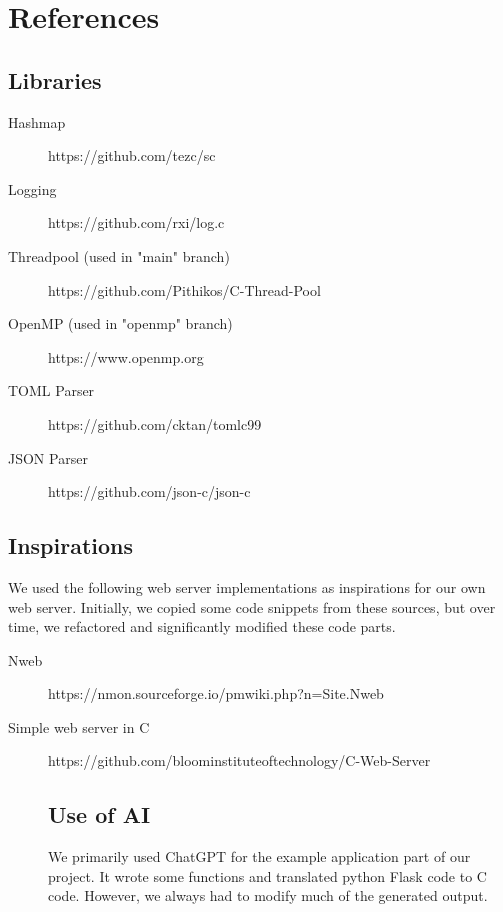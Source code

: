 \section*{References}

\subsection*{Libraries}
\begin{description}
    \item[Hashmap] https://github.com/tezc/sc
    \item[Logging] https://github.com/rxi/log.c
    \item[Threadpool (used in "main" branch)] https://github.com/Pithikos/C-Thread-Pool 
    \item[OpenMP (used in "openmp" branch)] https://www.openmp.org 
    \item[TOML Parser] https://github.com/cktan/tomlc99 
    \item[JSON Parser] https://github.com/json-c/json-c 
\end{description}

\subsection*{Inspirations}

We used the following web server implementations as inspirations for our own web server. Initially, we copied some code snippets from these sources, but over time, we refactored and significantly modified these code parts.

\begin{description}
    \item[Nweb] https://nmon.sourceforge.io/pmwiki.php?n=Site.Nweb
    \item[Simple web server in C] https://github.com/bloominstituteoftechnology/C-Web-Server

\subsection*{Use of AI}
We primarily used ChatGPT for the example application part of our project. It wrote some functions and translated python Flask code to C code. However, we always had to modify much of the generated output.

\end{description}

